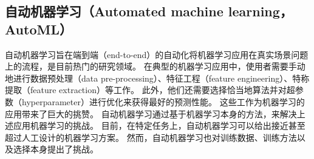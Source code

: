 


\subsection{自动机器学习（Automated machine learning，AutoML）}

自动机器学习旨在端到端（end-to-end）的自动化将机器学习应用在真实场景问题上的流程，是目前热门的研究领域\cite{feurer2015efficient, thornton2013auto, kotthoff2017auto}。
在典型的机器学习应用中，使用者需要手动地进行数据预处理（data pre-processing）、特征工程（feature engineering）、特称提取（feature extraction）等工作\cite{heaton2016empirical, nargesian2017learning}。
此外，他们还需要选择恰当地算法并对超参数（hyperparameter）进行优化来获得最好的{\model}预测性能\cite{snoek2012practical, brochu2010tutorial}。
这些工作为机器学习的应用带来了巨大的挑赞。
自动机器学习通过基于机器学习本身的方法，来解决上述应用机器学习的挑战。
目前，在特定任务上，自动机器学习可以给出接近甚至超过人工设计的机器学习方案。
然而，自动机器学习也对训练数据、训练方法以及{\model}选择本身提出了挑战。

